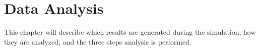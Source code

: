 \chapter{Data Analysis}
This chapter will describe which results are generated during the simulation,
how they are analyzed, and the three steps analysis is performed.
